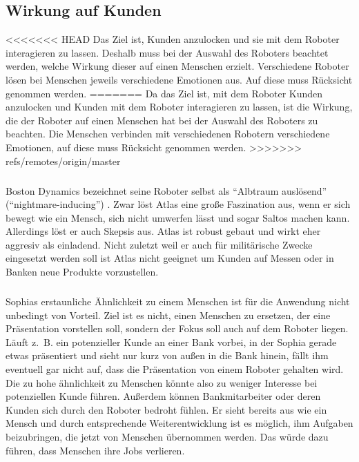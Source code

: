 
\subsection{Wirkung auf Kunden}
<<<<<<< HEAD
Das Ziel ist, Kunden anzulocken und sie mit dem Roboter interagieren zu lassen.
Deshalb muss bei der Auswahl des Roboters beachtet werden, welche Wirkung dieser
auf einen Menschen erzielt. Verschiedene Roboter lösen bei Menschen jeweils
verschiedene Emotionen aus. Auf diese muss Rücksicht genommen werden.
=======
Da das Ziel ist, mit dem Roboter Kunden anzulocken und Kunden mit dem Roboter
interagieren zu lassen, ist die Wirkung, die der Roboter auf einen Menschen hat
bei der Auswahl des Roboters zu beachten. 
Die Menschen verbinden mit verschiedenen Robotern verschiedene Emotionen, auf
diese muss Rücksicht genommen werden.
>>>>>>> refs/remotes/origin/master

\subparagraph{}
Boston Dynamics bezeichnet seine Roboter selbst als "`Albtraum auslösend"'
("`night\-mare-\-in\-du\-cing"') \cite{Guardian2018}. Zwar löst Atlas eine große
Faszination aus, wenn er sich bewegt wie ein Mensch, sich nicht umwerfen lässt
und sogar Saltos machen kann. Allerdings löst er auch Skepsis aus. Atlas ist
robust gebaut und wirkt eher aggresiv als einladend. Nicht zuletzt weil er auch
für militärische Zwecke eingesetzt werden soll ist Atlas nicht geeignet um
Kunden auf Messen oder in Banken neue Produkte vorzustellen.

\subparagraph{}
Sophias erstaunliche Ähnlichkeit zu einem Menschen ist für die Anwendung nicht
unbedingt von Vorteil. Ziel ist es nicht, einen Menschen zu ersetzen, der eine
Präsentation vorstellen soll, sondern der Fokus soll auch auf dem Roboter
liegen. Läuft z.~B. ein potenzieller Kunde an einer Bank vorbei, in der Sophia
gerade etwas präsentiert und sieht nur kurz von außen in die Bank hinein, fällt
ihm eventuell gar nicht auf, dass die Präsentation von einem Roboter gehalten
wird. Die zu hohe ähnlichkeit zu Menschen könnte also zu weniger Interesse bei
potenziellen Kunde führen. Außerdem können Bankmitarbeiter oder deren Kunden
sich durch den Roboter bedroht fühlen. Er sieht bereits aus wie ein Mensch und
durch entsprechende Weiterentwicklung ist es möglich, ihm Aufgaben beizubringen,
die jetzt von Menschen übernommen werden. Das würde dazu führen, dass Menschen
ihre Jobs verlieren.

